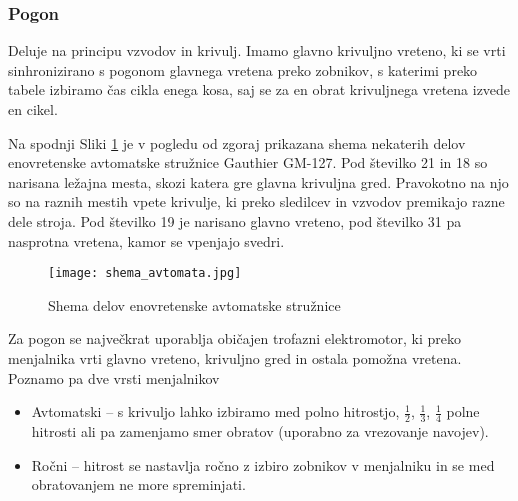 \subsubsection{Pogon}
Deluje na principu vzvodov in krivulj. Imamo glavno krivuljno
vreteno, ki se vrti sinhronizirano s pogonom glavnega vretena
preko zobnikov, s katerimi preko tabele izbiramo čas cikla enega
kosa, saj se za en obrat krivuljnega vretena izvede en cikel.

Na spodnji Sliki \ref{pogon} je v pogledu od zgoraj prikazana shema
nekaterih delov enovretenske avtomatske stružnice Gauthier GM-127. Pod številko 21 in 18
so narisana ležajna mesta, skozi katera gre glavna krivuljna gred.
Pravokotno na njo so na raznih mestih vpete krivulje, ki preko sledilcev
in vzvodov premikajo razne dele stroja. Pod številko 19 je narisano
glavno vreteno, pod številko 31 pa nasprotna vretena, kamor se vpenjajo svedri.
\begin{figure}[H]
	\begin{center}
		\texttt{[image: shema\_avtomata.jpg]}
		\caption{Shema delov enovretenske avtomatske stružnice
			\cite{gauthier}}
		\label{pogon}
	\end{center}
\end{figure}
Za pogon se največkrat uporablja običajen trofazni elektromotor,
ki preko menjalnika vrti glavno vreteno, krivuljno gred in ostala
pomožna vretena. Poznamo pa dve vrsti menjalnikov
\begin{itemize}
	\item Avtomatski -- s krivuljo lahko izbiramo med polno
	      hitrostjo, \( \frac{1}{2} \), \( \frac{1}{3} \), \( \frac{1}{4} \)
	      polne hitrosti ali pa zamenjamo
	      smer obratov (uporabno za vrezovanje navojev).

	\item Ročni -- hitrost se nastavlja ročno z izbiro zobnikov
	      v menjalniku in se med obratovanjem ne more spreminjati.
\end{itemize}

